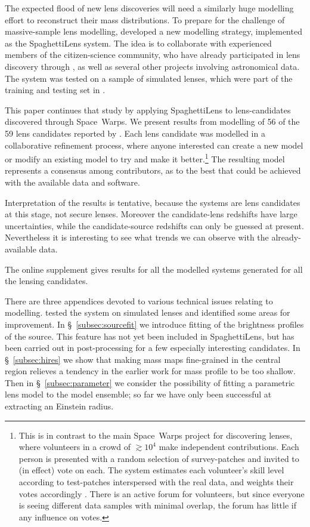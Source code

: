 The expected flood of new lens discoveries will need a similarly huge
modelling effort to reconstruct their mass distributions.  To prepare
for the challenge of massive-sample lens modelling,
\cite{2015MNRAS.447.2170K} developed a new modelling strategy,
implemented as the SpaghettiLens system.  The idea is to collaborate
with experienced members of the citizen-science community, who have
already participated in lens discovery through \SW, as well as several
other projects involving astronomical data.  The system was tested on
a sample of simulated lenses, which were part of the training and
testing set in \SW.

This paper continues that study by applying SpaghettiLens to
lens-candidates discovered through Space~Warps.  We present results
from modelling of 56 of the 59 lens candidates reported by
\cite{2016MNRAS.455.1191M}.  Each lens candidate was modelled in a
collaborative refinement process, where anyone interested can create a
new model or modify an existing model to try and make it
better.\footnote{This is in contrast to the main Space~Warps project
  for discovering lenses, where volunteers in a crowd of $\gtrsim10^4$
  make independent contributions.  Each person is presented with a
  random selection of survey-patches and invited to (in effect) vote
  on each.  The system estimates each volunteer's skill level
  according to test-patches interspersed with the real data, and
  weights their votes accordingly \citep{2016MNRAS.455.1171M}.  There
  is an active forum for volunteers, but since everyone is seeing
  different data samples with minimal overlap, the forum has little if
  any influence on votes.}  The resulting model represents a consensus
among contributors, as to the best that could be achieved with the
available data and software.

Interpretation of the results is tentative,
because the systems are lens candidates at this stage, not secure lenses.
Moreover the candidate-lens redshifts have large uncertainties, while
the candidate-source redshifts can only be guessed at present.
Nevertheless it is interesting to see what trends we can observe with
the already-available data.

The online supplement gives results for all the modelled systems generated
for all the lensing candidates.

There are three appendices devoted to various technical issues
relating to modelling.  \cite{2015MNRAS.447.2170K} tested the system
on simulated lenses and identified some areas for improvement.  In
\S~\ref{subsec:sourcefit} we introduce fitting of the brightness
profiles of the source.  This feature has not yet been included in
SpaghettiLens, but has been carried out in post-processing for a few
especially interesting candidates.  In \S~\ref{subsec:hires} we show
that making mass maps fine-grained in the central region relieves a
tendency in the earlier work for mass profile to be too shallow. Then in
\S~\ref{subsec:parameter} we consider the possibility of fitting a
parametric lens model to the model ensemble; so far we have only been
successful at extracting an Einstein radius.




